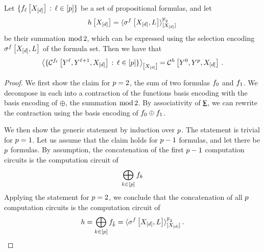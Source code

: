 \begin{lemma}\label{lem:comCircuitMod2}
    Let $\{f_{\ell}\left[X_{[d]}\right]\,:\,\ell\in[p]\}$ be a set of propositional formulas, and let
    \begin{align*}
        h\left[X_{[d]}\right]
        = \langle\sigma^{f}\left[X_{[d]},L\right]\rangle^{\mathbb{F}_2}_{[X_{[d]}]} \,
    \end{align*}
    be their summation $\mathrm{mod}\,2$, which can be expressed using the selection encoding $\sigma^{f}\left[X_{[d]},L\right]$ of the formula set.
    Then we have that
    \begin{align*}
        \left\langle 
            \{\mathcal{C}^{f_{\ell}}\left[Y^{\ell},Y^{\ell+1},X_{[d]}\right] \,:\, \ell\in[p]\}
        \right\rangle_{\left[ X_{[d]} \right]}
        = \mathcal{C}^{h}\left[Y^{0},Y^{p},X_{[d]}\right] \, .
    \end{align*}
\end{lemma}
\begin{proof}
    We first show the claim for $p=2$, the sum of two formulas $f_{0}$ and $f_{1}$.
    We decompose in  each \computationCircuit{} into a contraction of the functions basis encoding with the basis encoding of $\oplus$, the summation $\mathrm{mod}\,2$.
    By associativity of $\modtwosum$, we can rewrite the contraction using the basis encoding of $f_{0}\oplus f_{1}$.

    We then show the generic statement by induction over $p$.
    The statement is trivial for $p=1$.
    Let us assume that the claim holds for $p-1$ formulas, and let there be $p$ formulas.
    By assumption, the concatenation of the first $p-1$ computation circuits is the computation circuit of
    \begin{align*}
        \bigoplus_{k\in[p]}f_{k}
    \end{align*}
    Applying the statement for $p=2$, we conclude that the concatenation of all $p$ computation circuits is the computation circuit of
    \begin{align*}
        h
        =\bigoplus_{k\in[p]}f_{\tilde{k}}
        = \langle\sigma^{f}\left[X_{[d]},L\right]\rangle^{\mathbb{F}_2}_{[X_{[d]}]} \, .
    \end{align*}
\end{proof}


